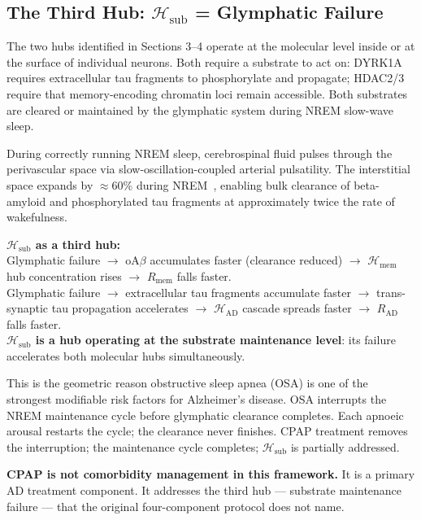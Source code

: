 \documentclass[12pt,a4paper]{article}
\newenvironment{warnenv}{%
  \begin{tcolorbox}[colback=red!5,colframe=warnbox,boxrule=1pt,
    arc=3pt,left=8pt,right=8pt,top=6pt,bottom=6pt,breakable]}{%
  \end{tcolorbox}}
\newenvironment{derivenv}{%
  \begin{tcolorbox}[colback=lightgray,colframe=midgray,boxrule=0.5pt,
    arc=3pt,left=8pt,right=8pt,top=6pt,bottom=6pt,breakable]}{%
  \end{tcolorbox}}
\newcommand{\RAD}{R_{\mathrm{AD}}}
\newcommand{\RMEM}{R_{\mathrm{mem}}}
\begin{document}
\subsection{The Third Hub: $\mathcal{H}_{\mathrm{sub}}$
= Glymphatic Failure}

The two hubs identified in Sections 3--4 operate at
the molecular level inside or at the surface of
individual neurons. Both require a substrate to act on:
DYRK1A requires extracellular tau fragments to
phosphorylate and propagate; HDAC2/3 require that
memory-encoding chromatin loci remain accessible.
Both substrates are cleared or maintained by the
glymphatic system during NREM slow-wave sleep.

During correctly running NREM sleep, cerebrospinal
fluid pulses through the perivascular space via
slow-oscillation-coupled arterial pulsatility. The
interstitial space expands by $\approx$60\% during
NREM~\cite{Xie2013}, enabling bulk clearance of
beta-amyloid and phosphorylated tau fragments at
approximately twice the rate of wakefulness.

\begin{derivenv}
\textbf{$\mathcal{H}_{\mathrm{sub}}$ as a third hub:}\\[4pt]
Glymphatic failure
$\to$ oA$\beta$ accumulates faster (clearance reduced)
$\to$ $\mathcal{H}_{\mathrm{mem}}$ hub concentration
rises $\to$ $\RMEM$ falls faster.\\[4pt]
Glymphatic failure
$\to$ extracellular tau fragments accumulate faster
$\to$ trans-synaptic tau propagation accelerates
$\to$ $\mathcal{H}_{\mathrm{AD}}$ cascade spreads faster
$\to$ $\RAD$ falls faster.\\[4pt]
\textbf{$\mathcal{H}_{\mathrm{sub}}$ is a hub operating
at the substrate maintenance level}: its failure
accelerates both molecular hubs simultaneously.
\end{derivenv}

This is the geometric reason obstructive sleep apnea
(OSA) is one of the strongest modifiable risk factors
for Alzheimer's disease. OSA interrupts the NREM
maintenance cycle before glymphatic clearance
completes. Each apnoeic arousal restarts the cycle;
the clearance never finishes. CPAP treatment removes
the interruption; the maintenance cycle completes;
$\mathcal{H}_{\mathrm{sub}}$ is partially addressed.

\begin{warnenv}
\textbf{CPAP is not comorbidity management in this
framework.} It is a primary AD treatment component.
It addresses the third hub --- substrate maintenance
failure --- that the original four-component protocol
does not name.
\end{warnenv}
\end{document}
